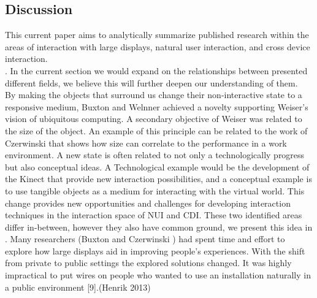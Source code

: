 \subsection{Discussion}
This current paper aims to analytically summarize published research within the areas of interaction with large displays, natural user interaction, and cross device interaction.\\. In the current section we would expand on the relationships between presented different fields, we believe this will further deepen our understanding of them.\\
By making the objects that surround us change their non-interactive state to a responsive medium, Buxton and Welnner achieved a novelty supporting Weiser's vision of ubiquitous computing. A secondary objective of Weiser was related to the size of the object. An example of this principle can be related to the work of Czerwinski that shows how size can correlate to the performance in a work environment.
A new state is often related to not only a technologically progress but also conceptual ideas. A Technological example would be the development of the Kinect that provide new interaction possibilities\cite{Wilson:2010}, and a conceptual example is to use tangible objects as a medium for interacting with the virtual world\cite{Rekimoto:1997, Keefe:2001}.
This change provides new opportunities and challenges for developing interaction techniques in the interaction space of NUI and CDI. These two identified areas differ in-between, however they also have common ground, we present this idea in .
Many researchers (Buxton and Czerwinski ) had spent time and effort to explore how large displays aid in improving people's experiences. 
With the shift from private to public settings the explored solutions changed. 
It was highly impractical to put wires on people who wanted to use an installation naturally in a public environment [9].(Henrik 2013)\\

